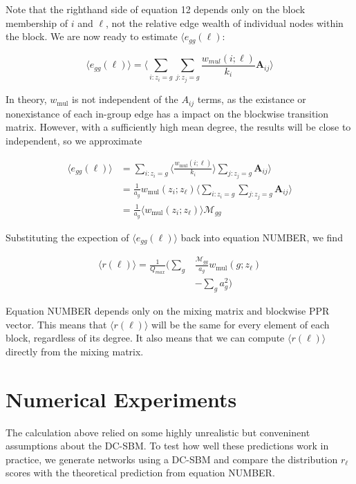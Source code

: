 \documentclass[12pt]{article}
\begin{document}
Note that the righthand side of equation 12 depends only on the block membership of $i$ and $\ell$, not the relative edge wealth of individual nodes within the block.  We are now ready to estimate $\langle e_{gg}(\ell)$:

\begin{equation}
  \langle e_{gg}(\ell) \rangle = \langle \sum_{i:z_i = g} \sum_{j: z_j = g} \frac{w_{mul}(i;\ell)}{k_i} \mathbf{A}_{ij}\rangle
\end{equation}

In theory, $w_\text{mul}$ is not independent of the $A_{ij}$ terms, as the existance or nonexistance of each in-group edge has a impact on the blockwise transition matrix.  However, with a sufficiently high mean degree, the results will be close to independent, so we approximate

\begin{equation}
  \begin{aligned}
    \langle e_{gg}(\ell) \rangle &=  \sum_{i: z_i = g} \langle \frac{w_\text{mul}(i; \ell)}{k_i} \rangle \sum_{j: z_j = g}  \mathbf{A}_{ij} \big \rangle \\
    &=  \frac{1}{a_g} w_\text{mul}(z_i; z_\ell) \big \langle \sum_{i: z_i = g}  \sum_{j: z_j = g}  \mathbf{A}_{ij} \big \rangle \\
    &= \frac{1}{a_g} \langle w_\text{mul}(z_i; z_\ell) \rangle \mathcal{M}_{gg}
  \end{aligned}
\end{equation}

Substituting the expection of $\langle e_{gg}(\ell)\rangle$ back into equation NUMBER, we find

\begin{equation}
  \begin{aligned}
    \langle r(\ell) \rangle = \frac{1}{Q_{max}}\bigg ( \sum_g &\frac{\mathcal{M}_{gg}}{a_g} w_\text{mul}(g; z_\ell)\\ 
    & - \sum_g a_g^2 \bigg )
  \end{aligned}
\end{equation}

Equation NUMBER depends only on the mixing matrix and blockwise PPR vector.  This means that $\langle r(\ell) \rangle$ will be the same for every element of each block, regardless of its degree.  It also means that we can compute $\langle r(\ell) \rangle$ directly from the mixing matrix.

\section{Numerical Experiments}
The calculation above relied on some highly unrealistic but conveninent assumptions about the DC-SBM.  To test how well these predictions work in practice, we generate networks using a DC-SBM and compare the distribution $r_\ell$ scores with the theoretical prediction from equation NUMBER.
\end{document}

